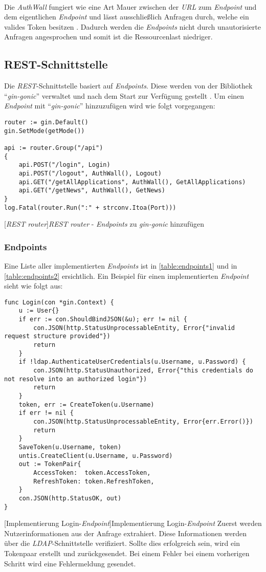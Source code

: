 ~\\
Die \textit{AuthWall} fungiert wie eine Art Mauer zwischen der \textit{URL} zum \textit{Endpoint} und dem eigentlichen \textit{Endpoint} und lässt ausschließlich Anfragen durch, welche ein valides Token besitzen \cite{tokenmanager}. Dadurch werden die \textit{Endpoints} nicht durch unautorisierte Anfragen angesprochen und somit ist die Ressourcenlast niedriger.

\newpage

\subsection{REST-Schnittstelle}
Die \textit{REST}-Schnittstelle basiert auf \textit{Endpoints}. Diese werden von der Bibliothek \enquote{\textit{gin-gonic}} verwaltet und nach dem Start zur Verfügung gestellt \cite{gingonic}. Um einen \textit{Endpoint} mit \enquote{\textit{gin-gonic}} hinzuzufügen wird wie folgt vorgegangen:

\begin{verbatim}
router := gin.Default()
gin.SetMode(getMode())

api := router.Group("/api")
{
	api.POST("/login", Login)
	api.POST("/logout", AuthWall(), Logout)
	api.GET("/getAllApplications", AuthWall(), GetAllApplications)
	api.GET("/getNews", AuthWall(), GetNews)
}
log.Fatal(router.Run(":" + strconv.Itoa(Port)))
\end{verbatim} 
[\textit{REST} \textit{router}]{\textit{REST} \textit{router} - \textit{Endpoints} zu \textit{gin-gonic} hinzufügen}

\subsubsection{Endpoints}

Eine Liste aller implementierten \textit{Endpoints} ist in \autoref{table:endpoints1} und in \autoref{table:endpoints2} ersichtlich. Ein Beispiel für einen implementierten \textit{Endpoint} sieht wie folgt aus:

\begin{verbatim}
func Login(con *gin.Context) {
	u := User{}
	if err := con.ShouldBindJSON(&u); err != nil {
		con.JSON(http.StatusUnprocessableEntity, Error{"invalid request structure provided"})
		return
	}
	if !ldap.AuthenticateUserCredentials(u.Username, u.Password) {
		con.JSON(http.StatusUnauthorized, Error{"this credentials do not resolve into an authorized login"})
		return
	}
	token, err := CreateToken(u.Username)
	if err != nil {
		con.JSON(http.StatusUnprocessableEntity, Error{err.Error()})
		return
	}
	SaveToken(u.Username, token)
	untis.CreateClient(u.Username, u.Password)
	out := TokenPair{
		AccessToken:  token.AccessToken,
		RefreshToken: token.RefreshToken,
	}
	con.JSON(http.StatusOK, out)
}
\end{verbatim}
[Implementierung Login-\textit{Endpoint}]{Implementierung Login-\textit{Endpoint}}
Zuerst werden Nutzerinformationen aus der Anfrage extrahiert. Diese Informationen werden über die \textit{LDAP}-Schnittstelle verifiziert. Sollte dies erfolgreich sein, wird ein Tokenpaar erstellt und zurückgesendet. Bei einem Fehler bei einem vorherigen Schritt wird eine Fehlermeldung gesendet.

